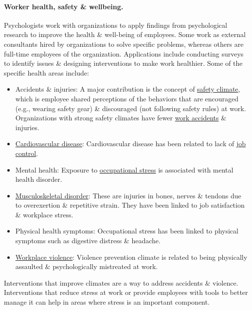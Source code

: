 \documentclass[oneside]{book}
\numberwithin{equation}{section}
\begin{document}
\paragraph{Worker health, safety \& wellbeing.} Psychologists work with organizations to apply findings from psychological research to improve the health \& well-being of employees. Some work as external consultants hired by organizations to solve specific problems, whereas others are full-time employees of the organization. Applications include conducting surveys to identify issues \& designing interventions to make work healthier. Some of the specific health areas include:
\begin{itemize}
	\item Accidents \& injuries: A major contribution is the concept of \href{https://en.wikipedia.org/wiki/Safety_climate}{safety climate}, which is employee shared perceptions of the behaviors that are encouraged (e.g., wearing safety gear) \& discouraged (not following safety rules) at work. Organizations with strong safety climates have fewer \href{https://en.wikipedia.org/wiki/Work_accidents}{work accidents} \& injuries.
	\item \href{v}{Cardiovascular disease}: Cardiovascular disease has been related to lack of \href{https://en.wikipedia.org/wiki/Job_control_(workplace)}{job control}.
	\item Mental health: Exposure to \href{https://en.wikipedia.org/wiki/Occupational_stress}{occupational stress} is associated with mental health disorder.
	\item \href{https://en.wikipedia.org/wiki/Musculoskeletal_disorder}{Musculoskeletal disorder}: These are injuries in bones, nerves \& tendons due to overexertion \& repetitive strain. They have been linked to job satisfaction \& workplace stress.
	\item Physical health symptoms: Occupational stress has been linked to physical symptoms such as digestive distress \& headache.
	\item \href{https://en.wikipedia.org/wiki/Workplace_violence}{Workplace violence}: Violence prevention climate is related to being physically assaulted \& psychologically mistreated at work.
\end{itemize}
Interventions that improve climates are a way to address accidents \& violence. Interventions that reduce stress at work or provide employees with tools to better manage it can help in areas where stress is an important component.
\end{document}
